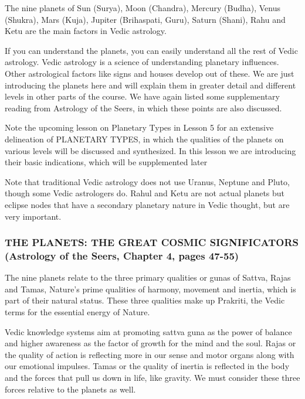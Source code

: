 The nine planets of Sun (Surya), Moon (Chandra), Mercury (Budha), Venus (Shukra), Mars (Kuja), Jupiter (Brihaspati, Guru), Saturn (Shani), Rahu and Ketu are the main factors in Vedic astrology.

 

If you can understand the planets, you can easily understand all the rest of Vedic astrology. Vedic astrology is a science of understanding planetary influences. Other astrological factors like signs and houses develop out of these. We are just introducing the planets here and will explain them in greater detail and different levels in other parts of the course. We have again listed some supplementary reading from Astrology of the Seers, in which these points are also discussed.

Note the upcoming lesson on Planetary Types in Lesson 5 for an extensive delineation of  PLANETARY TYPES, in which the qualities of the planets on various levels will be discussed and synthesized. In this lesson we are introducing their basic indications, which will be supplemented later

Note that traditional Vedic astrology does not use Uranus, Neptune and Pluto, though some Vedic astrologers do. Rahul and Ketu are not actual planets but eclipse nodes that have a secondary planetary nature in Vedic thought, but are very important.

 

\subsubsection{THE PLANETS: THE GREAT COSMIC SIGNIFICATORS (Astrology of the Seers, Chapter 4, pages 47-55)}


 

The nine planets relate to the three primary qualities or gunas of Sattva, Rajas and Tamas, Nature’s prime qualities of harmony, movement and inertia, which is  part of their natural status. These three qualities make up Prakriti, the Vedic terms for the essential energy of Nature.

 

Vedic knowledge systems aim at promoting sattva guna as the power of balance and higher awareness as the factor of growth for the mind and the soul. Rajas or the quality of action is reflecting more in our sense and motor organs along with our emotional impulses. Tamas or the quality of inertia is reflected in the body and the forces that pull us down in life, like gravity. We must consider these three forces relative to the planets as well.

